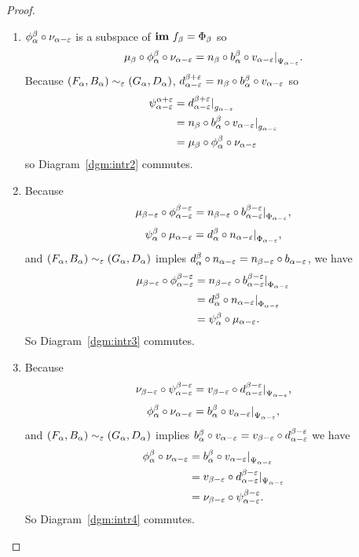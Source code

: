 \begin{proof}
\begin{enumerate}[label=\Roman*.]
    \item $\phi_\alpha^\beta\circ \nu_{\alpha-\varepsilon}$ is a subspace of $\mathbf{im}~f_\beta = \Phi_\beta$ so
      \[ \mu_\beta\circ \phi_\alpha^\beta\circ \nu_{\alpha-\varepsilon} = n_\beta\circ b_\alpha^\beta\circ v_{\alpha-\varepsilon}\mathord{\mid}_{\Psi_{\alpha-\varepsilon}}. \]
      Because $(F_\alpha, B_\alpha)\sim_\varepsilon (G_\alpha, D_\alpha)$, $d_{\alpha-\varepsilon}^{\beta+\varepsilon} = n_\beta\circ b_\alpha^\beta\circ v_{\alpha-\varepsilon}$ so
      \begin{align*}
        \psi_{\alpha-\varepsilon}^{\alpha+\varepsilon} &= d_{\alpha-\varepsilon}^{\beta+\varepsilon}\mathord{\mid}_{g_{\alpha-\varepsilon}}\\
          &=n_\beta\circ b_\alpha^\beta\circ v_{\alpha-\varepsilon}\mathord{\mid}_{g_{\alpha-\varepsilon}}\\
          &= \mu_\beta\circ \phi_\alpha^\beta\circ \nu_{\alpha-\varepsilon}
      \end{align*}
      so Diagram~\ref{dgm:intr2} commutes.
    \item Because
      \[ \mu_{\beta - \varepsilon}\circ \phi_{\alpha-\varepsilon}^{\beta-\varepsilon} = n_{\beta-\varepsilon}\circ b_{\alpha-\varepsilon}^{\beta-\varepsilon}\mathord{\mid}_{\Phi_{\alpha-\varepsilon}}, \]
      \[ \psi_\alpha^\beta\circ\mu_{\alpha-\varepsilon} = d_\alpha^\beta\circ n_{\alpha-\varepsilon}\mathord{\mid}_{\Phi_{\alpha-\varepsilon}},\]
      and $(F_\alpha, B_\alpha)\sim_\varepsilon (G_\alpha, D_\alpha)$ imples $d_\alpha^\beta\circ n_{\alpha-\varepsilon} = n_{\beta-\varepsilon}\circ b_{\alpha-\varepsilon}$, we have
      \begin{align*}
        \mu_{\beta - \varepsilon}\circ \phi_{\alpha-\varepsilon}^{\beta-\varepsilon} &= n_{\beta-\varepsilon}\circ b_{\alpha-\varepsilon}^{\beta-\varepsilon}\mathord{\mid}_{\Phi_{\alpha-\varepsilon}}\\
          &= d_\alpha^\beta\circ n_{\alpha-\varepsilon}\mathord{\mid}_{\Phi_{\alpha-\varepsilon}}\\
          &= \psi_\alpha^\beta\circ\mu_{\alpha-\varepsilon}.
      \end{align*}
      So Diagram~\ref{dgm:intr3} commutes.
    \item Because
      \[\nu_{\beta-\varepsilon}\circ \psi_{\alpha-\varepsilon}^{\beta-\varepsilon} = v_{\beta-\varepsilon}\circ d_{\alpha-\varepsilon}^{\beta-\varepsilon}\mathord{\mid}_{\Psi_{\alpha-\varepsilon}},\]
      \[\phi_\alpha^\beta\circ \nu_{\alpha-\varepsilon} = b_\alpha^\beta\circ v_{\alpha-\varepsilon}\mathord{\mid}_{\Psi_{\alpha-\varepsilon}},\]
      and $(F_\alpha, B_\alpha)\sim_\varepsilon (G_\alpha, D_\alpha)$ implies $b_\alpha^\beta\circ v_{\alpha-\varepsilon} = v_{\beta-\varepsilon}\circ d_{\alpha-\varepsilon}^{\beta-\varepsilon}$ we have
      \begin{align*}
        \phi_\alpha^\beta\circ \nu_{\alpha-\varepsilon} &= b_\alpha^\beta\circ v_{\alpha-\varepsilon}\mathord{\mid}_{\Psi_{\alpha-\varepsilon}}\\
          &= v_{\beta-\varepsilon}\circ d_{\alpha-\varepsilon}^{\beta-\varepsilon}\mathord{\mid}_{\Psi_{\alpha-\varepsilon}}\\
          &= \nu_{\beta-\varepsilon}\circ \psi_{\alpha-\varepsilon}^{\beta-\varepsilon}.
      \end{align*}
      So Diagram~\ref{dgm:intr4} commutes.
    \end{enumerate}
\end{proof}


